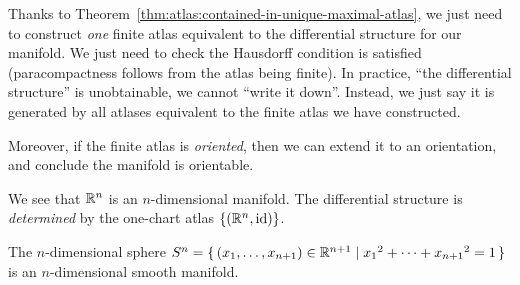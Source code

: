 Thanks to Theorem~\ref{thm:atlas:contained-in-unique-maximal-atlas},
we just need to construct \emph{one} finite atlas equivalent to the
differential structure for our manifold. We just need to check the
Hausdorff condition is satisfied (paracompactness follows from the atlas
being finite). In practice, ``the differential
structure'' is unobtainable, we cannot ``write it down''. Instead, we
just say it is generated by all atlases equivalent to the finite atlas
we have constructed.

Moreover, if the finite atlas is \emph{oriented}, then we can extend it
to an orientation, and conclude the manifold is orientable.

\begin{example}
We see that $\mathbb{R}^{n}$ is an $n$-dimensional manifold. The differential
structure is \emph{determined} by the one-chart atlas $\{(\mathbb{R}^{n},\operatorname{id})\}$.
\end{example}

\begin{example}
The $n$-dimensional sphere $S^{n}=\{\,(x_{1},\dots,x_{n+1})\in\mathbb{R}^{n+1}\mid{x_{1}}^{2}+\cdots+{x_{n+1}}^{2}=1\,\}$
is an $n$-dimensional smooth manifold.
\end{example}

